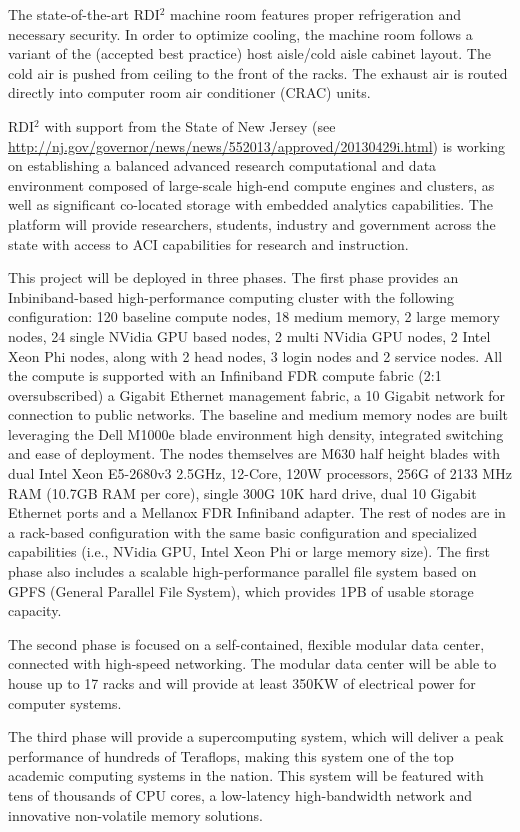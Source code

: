 The state-of-the-art RDI$^2$ machine room features proper refrigeration and necessary security. In order to optimize cooling, the machine room follows a variant of the (accepted best practice) host aisle/cold aisle cabinet layout. The cold air is pushed from ceiling to the front of the racks. The exhaust air is routed directly into computer room air conditioner (CRAC) units.

RDI$^2$ with support from the State of New Jersey (see  \url{http://nj.gov/governor/news/news/552013/approved/20130429i.html}) is working on establishing a balanced advanced research computational and data environment composed of large-scale high-end compute engines and clusters, as well as significant co-located storage with embedded analytics capabilities. The platform will provide researchers, students, industry and government across the state with access to ACI capabilities for research and instruction.

This project will be deployed in three phases. The first phase provides an Inbiniband-based high-performance computing cluster with the following configuration: 120 baseline compute nodes, 18 medium memory, 2 large memory nodes, 24 single NVidia GPU based nodes, 2 multi NVidia GPU nodes, 2 Intel Xeon Phi nodes, along with 2 head nodes, 3 login nodes and 2 service nodes. All the compute is supported with an Infiniband FDR compute fabric (2:1 oversubscribed) a Gigabit Ethernet management fabric, a 10 Gigabit network for connection to public networks. The baseline and medium memory nodes are built leveraging the Dell M1000e blade environment high density, integrated switching and ease of deployment. The nodes themselves are M630 half height blades with dual Intel Xeon E5-2680v3 2.5GHz, 12-Core, 120W processors, 256G of 2133 MHz RAM (10.7GB RAM per core), single 300G 10K hard drive, dual 10 Gigabit Ethernet ports and a Mellanox FDR Infiniband adapter. The rest of nodes are in a rack-based configuration with the same basic configuration and specialized capabilities (i.e., NVidia GPU, Intel Xeon Phi or large memory size). The first phase also includes a scalable high-performance parallel file system based on GPFS (General Parallel File System), which provides 1PB of usable storage capacity.

The second phase is focused on a self-contained, flexible modular data center, connected with high-speed networking. The modular data center will be able to house up to 17 racks and will provide at least 350KW of electrical power for computer systems.

The third phase will provide a supercomputing system, which will deliver a peak performance of hundreds of Teraflops, making this system one of the top academic computing systems in the nation. This system will be featured with tens of thousands of CPU cores, a low-latency high-bandwidth network and innovative non-volatile memory solutions.
